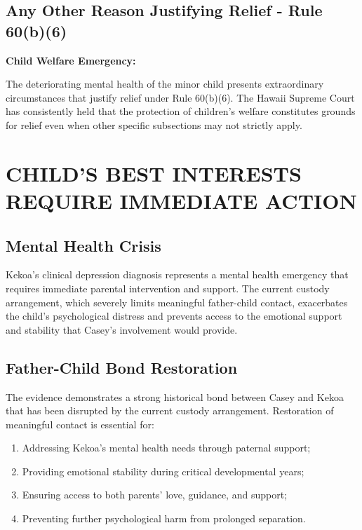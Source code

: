 \documentclass[12pt,letterpaper]{article}
\begin{document}
\subsection{Any Other Reason Justifying Relief - Rule 60(b)(6)}

\textbf{Child Welfare Emergency:}

The deteriorating mental health of the minor child presents extraordinary circumstances that justify relief under Rule 60(b)(6). The Hawaii Supreme Court has consistently held that the protection of children's welfare constitutes grounds for relief even when other specific subsections may not strictly apply.

\section{CHILD'S BEST INTERESTS REQUIRE IMMEDIATE ACTION}

\subsection{Mental Health Crisis}

Kekoa's clinical depression diagnosis represents a mental health emergency that requires immediate parental intervention and support. The current custody arrangement, which severely limits meaningful father-child contact, exacerbates the child's psychological distress and prevents access to the emotional support and stability that Casey's involvement would provide.

\subsection{Father-Child Bond Restoration}

The evidence demonstrates a strong historical bond between Casey and Kekoa that has been disrupted by the current custody arrangement. Restoration of meaningful contact is essential for:

\begin{enumerate}
\item Addressing Kekoa's mental health needs through paternal support;
\item Providing emotional stability during critical developmental years;
\item Ensuring access to both parents' love, guidance, and support;
\item Preventing further psychological harm from prolonged separation.
\end{enumerate}
\end{document}
